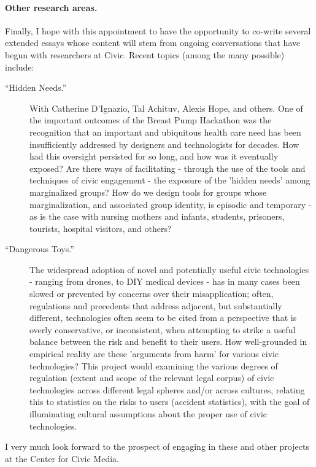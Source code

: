 \documentclass[10pt]{article}
\begin{document}

\paragraph{Other research areas.} Finally, I hope with this appointment to have the opportunity to co-write several extended essays whose content will stem from ongoing conversations that have begun with researchers at Civic.  Recent topics (among the many possible) include: 

\begin{description}

\item[``Hidden Needs.''] With Catherine D'Ignazio, Tal Achituv, Alexis Hope, and others.  One of the important outcomes of the Breast Pump Hackathon was the recognition that an important and ubiquitous health care need has been insufficiently addressed by designers and technologists for decades. How had this oversight persisted for so long, and how was it eventually exposed?  Are there ways of facilitating - through the use of the tools and techniques of civic engagement - the exposure of the 'hidden needs' among marginalized groups?  How do we design tools for groups whose marginalization, and associated group identity, is episodic and temporary - as is the case with nursing mothers and infants, students, prisoners, tourists, hospital visitors, and others?

\item[``Dangerous Toys.''] The widespread adoption of novel and potentially useful civic technologies - ranging from drones, to DIY medical devices - has in many cases been slowed or prevented by concerns over their misapplication; often, regulations and precedents that address adjacent, but substantially different, technologies often seem to be cited from a perspective that is overly conservative, or inconsistent, when attempting to strike a useful balance between the risk and benefit to their users. How well-grounded in empirical reality are these 'arguments from harm' for various civic technologies?  This project would examining the various degrees of regulation (extent and scope of the relevant legal corpus) of civic technologies across different legal spheres and/or across cultures, relating this to statistics on the risks to users (accident statistics), with the goal of illuminating cultural assumptions about the proper use of civic technologies. 


\end{description}

I very much look forward to the prospect of engaging in these and other projects at the Center for Civic Media.
\end{document}
